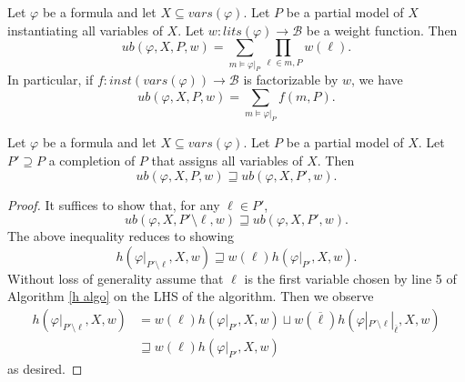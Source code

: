 \documentclass[acmsmall,review]{acmart}\settopmatter{printfolios=true,printccs=false,printacmref=false}
\begin{document}
\begin{corollary}\label{ub invariant for total models}
  Let $\varphi$ be a formula and let $X \subseteq vars(\varphi)$. Let $P$ be a partial model of $X$ instantiating all variables of $X$. Let $w : lits(\varphi) \to \mathcal B$ be a weight function. Then
  \begin{equation}
    ub(\varphi, X, P, w) = \sum_{m \models \varphi|_P} \prod_{\ell \in m, P} w(\ell).
  \end{equation}
  In particular, if $f : inst(vars(\varphi)) \to \mathcal B$ is factorizable by $w$, we have
  \begin{equation}
    ub(\varphi, X, P, w) = \sum_{m \models \varphi|_P} f(m,P).
  \end{equation}
\end{corollary}

\begin{lemma}\label{upper bounds pm}
  Let $\varphi$ be a formula and let $X \subseteq vars(\varphi)$. Let $P$ be a partial model of $X$. Let $P' \supseteq P$ a completion of $P$ that assigns all variables of $X$. Then 
  \begin{equation}
    ub(\varphi, X, P, w) \sqsupseteq ub(\varphi, X , P',w).
  \end{equation}
\end{lemma}

\begin{proof}
  It suffices to show that, for any $\ell \in P'$,
  \begin{equation}
    ub(\varphi, X, P' \setminus \ell, w) \sqsupseteq ub(\varphi, X, P', w).
  \end{equation}
  The above inequality reduces to showing
  \begin{equation}
    h(\varphi|_{P' \setminus \ell}, X, w) \sqsupseteq w(\ell) h(\varphi|_{P'}, X,w).
  \end{equation}
  Without loss of generality assume that $\ell$ is the first variable chosen by line 5 of Algorithm \ref{h algo} on the LHS of the algorithm. Then we observe
  \begin{align*}
    h(\varphi|_{P' \setminus \ell}, X, w)
      &= w(\ell)h(\varphi|_{P'}, X, w) 
        \sqcup  w(\overline{\ell})h(\varphi|_{P' \setminus \ell}|_{\overline \ell}, X, w)\\
      &\sqsupseteq w(\ell)h(\varphi|_{P'}, X, w)
  \end{align*}
  as desired.
\end{proof}
\end{document}
